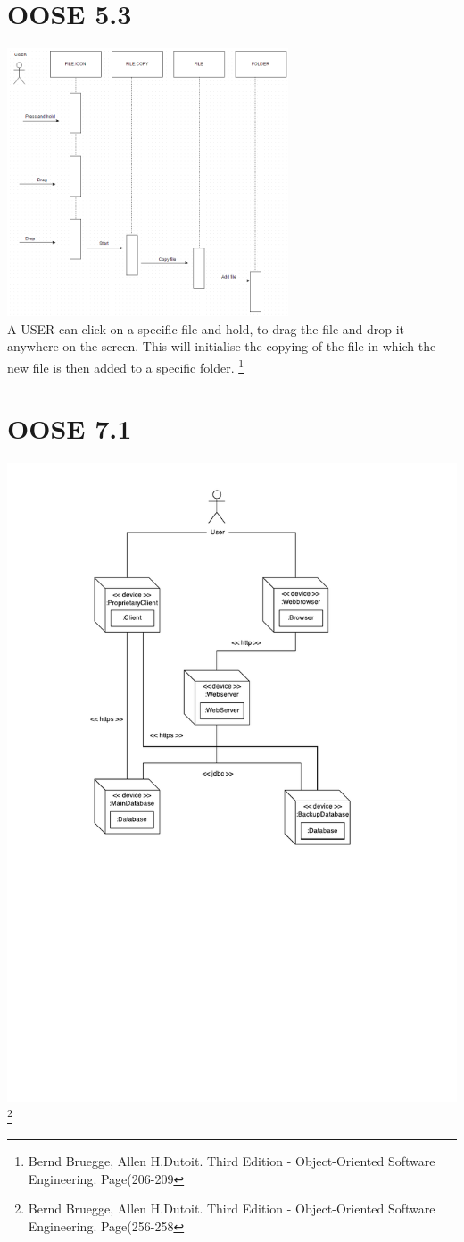 \documentclass[12pt,a4paper]{article}
\begin{document}
\section{OOSE 5.3}
\includegraphics[height=300px]{Sequence.png}\\
A USER can click on a specific file and hold, to drag the file and drop it anywhere on the screen. This will initialise the copying of the file in which the new file is then added to a specific folder. \footnote{Bernd Bruegge, Allen H.Dutoit. Third Edition - Object-Oriented Software Engineering. Page(206-209}

\newpage

\section{OOSE 7.1}
\includegraphics{DeploymentDiagram.pdf}\footnote{Bernd Bruegge, Allen H.Dutoit. Third Edition - Object-Oriented Software Engineering. Page(256-258}
\end{document}

